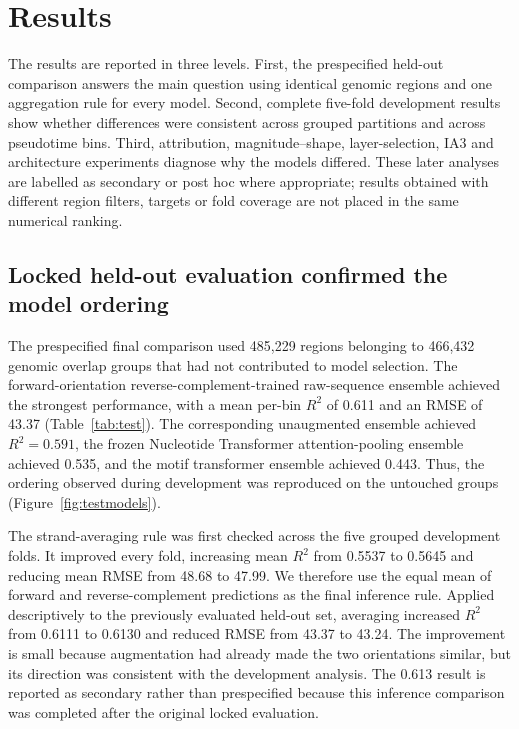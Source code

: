 \documentclass[a4paper,12pt]{article}
\begin{document}
\section{Results}

The results are reported in three levels. First, the prespecified held-out comparison answers the main question using identical genomic regions and one aggregation rule for every model. Second, complete five-fold development results show whether differences were consistent across grouped partitions and across pseudotime bins. Third, attribution, magnitude--shape, layer-selection, IA3 and architecture experiments diagnose why the models differed. These later analyses are labelled as secondary or post hoc where appropriate; results obtained with different region filters, targets or fold coverage are not placed in the same numerical ranking.

\subsection{Locked held-out evaluation confirmed the model ordering}

The prespecified final comparison used 485,229 regions belonging to 466,432 genomic overlap groups that had not contributed to model selection. The forward-orientation reverse-complement-trained raw-sequence ensemble achieved the strongest performance, with a mean per-bin $R^2$ of 0.611 and an RMSE of 43.37 (Table~\ref{tab:test}). The corresponding unaugmented ensemble achieved $R^2=0.591$, the frozen Nucleotide Transformer attention-pooling ensemble achieved 0.535, and the motif transformer ensemble achieved 0.443. Thus, the ordering observed during development was reproduced on the untouched groups (Figure~\ref{fig:testmodels}).

The strand-averaging rule was first checked across the five grouped development folds. It improved every fold, increasing mean $R^2$ from 0.5537 to 0.5645 and reducing mean RMSE from 48.68 to 47.99. We therefore use the equal mean of forward and reverse-complement predictions as the final inference rule. Applied descriptively to the previously evaluated held-out set, averaging increased $R^2$ from 0.6111 to 0.6130 and reduced RMSE from 43.37 to 43.24. The improvement is small because augmentation had already made the two orientations similar, but its direction was consistent with the development analysis. The 0.613 result is reported as secondary rather than prespecified because this inference comparison was completed after the original locked evaluation.
\end{document}
